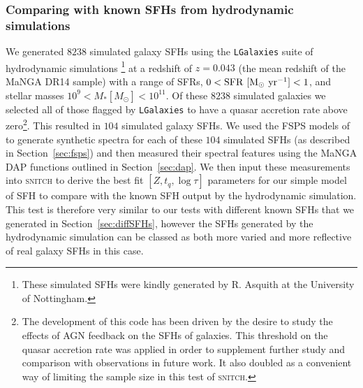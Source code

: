 \documentclass[useAMS,usenatbib]{mn2e}
\begin{document}

\subsubsection{Comparing with known SFHs from hydrodynamic simulations}\label{sec:lgalaxies}



We generated $8238$ simulated galaxy SFHs using the \texttt{LGalaxies} suite of hydrodynamic simulations \citep{henriques15}\footnote{These simulated SFHs were kindly generated by R. Asquith at the University of Nottingham.} at a redshift of $z=0.043$ (the mean redshift of the MaNGA DR14 sample) with a range of SFRs, $0 < \rm{SFR}~[M_{\odot}~\rm{yr}^{-1}] < 1$, and stellar masses $10^9 < M_{*} [M_{\odot}] < 10^{11}$. Of these $8238$ simulated galaxies we selected all of those flagged by \texttt{LGalaxies} to have a quasar accretion rate above zero\footnote{The development of this code has been driven by the desire to study the effects of AGN feedback on the SFHs of galaxies. This threshold on the quasar accretion rate was applied in order to supplement further study and comparison with observations in future work. It also doubled as a convenient way of limiting the sample size in this test of \textsc{snitch}.}. This resulted in $104$ simulated galaxy SFHs. We used the FSPS models of \cite{conroy10} to generate synthetic spectra for each of these $104$ simulated SFHs (as described in Section~\ref{sec:fsps}) and then measured their spectral features using the MaNGA DAP functions outlined in Section~\ref{sec:dap}. We then input these measurements into \textsc{snitch} to derive the best fit $[Z, t_q, \log \tau]$ parameters for our simple model of SFH to compare with the known SFH output by the hydrodynamic simulation. This test is therefore very similar to our tests with different known SFHs that we generated in Section~\ref{sec:diffSFHs}, however the SFHs generated by the hydrodynamic simulation can be classed as both more varied and more reflective of real galaxy SFHs in this case.
\end{document}
